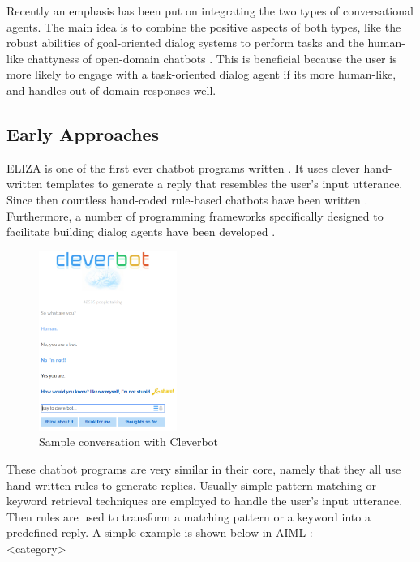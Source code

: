 \documentclass[12pt]{article}
\begin{document}
Recently an emphasis has been put on integrating the two types of conversational agents. The main idea is to combine the positive aspects of both types, like the robust abilities of goal-oriented dialog systems to perform tasks and the human-like chattyness of open-domain chatbots \cite{Zhao:2017,Yu:2017,Serban:2017}. This is beneficial because the user is more likely to engage with a task-oriented dialog agent if its more human-like, and handles out of domain responses well.

\subsection{Early Approaches} \label{ssec:22}

ELIZA is one of the first ever chatbot programs written \cite{Weizenbaum:1966}. It uses clever hand-written templates to generate a reply that resembles the user's input utterance. Since then countless hand-coded rule-based chatbots have been written \cite{Wallace:2009,Cleverbot:2017,Mitsuku:2017}. Furthermore, a number of programming frameworks specifically designed to facilitate building dialog agents have been developed \cite{Marietto:2013,Microsoft:2017}.

\begin{figure}[H]
	\label{fig:22a}
	\centering
	\includegraphics[width=0.4\textwidth]{pics/cleverbot.png}
	\caption{Sample conversation with Cleverbot \cite{Cleverbot:2017}}
\end{figure}


These chatbot programs are very similar in their core, namely that they all use hand-written rules to generate replies. Usually simple pattern matching or keyword retrieval techniques are employed to handle the user's input utterance. Then rules are used to transform a matching pattern or a keyword into a predefined reply.
A simple example is shown below in AIML \cite{Marietto:2013}:\\
{\color{OliveGreen}\textless category\textgreater}
\end{document}
